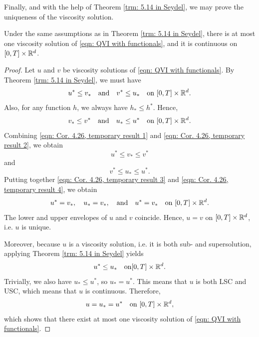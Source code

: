 Finally, and with the help of Theorem \ref{trm: 5.14 in Seydel}, we may prove the uniqueness of the viscosity solution.

\begin{corollary} 
\label{cor: Corollary 5.15 in Seydel}
    Under the same assumptions as in Theorem \ref{trm: 5.14 in Seydel}, there is at most one viscosity solution of \eqref{eqn: QVI with functionals}, and it is continuous on $[0,T] \times \mathbb{R}^d$. 
\end{corollary}
\begin{proof}
    Let $u$ and $v$ be viscosity solutions of \eqref{eqn: QVI with functionals}. By Theorem \ref{trm: 5.14 in Seydel}, we must have
    \begin{equation}
        u^* \leq v_* \quad \text{and} \quad v^* \leq u_* \quad \text{on } [0,T] \times \mathbb{R}^d. 
        \label{eqn: Cor. 4.26, temporary result 1}
    \end{equation}
    Also, for any function $h$, we always have $h_* \leq h^*$. Hence,
    \begin{equation}
        v_* \leq v^* \quad \text{and} \quad u_* \leq u^* \quad \text{on } [0,T] \times \mathbb{R}^d.
        \label{eqn: Cor. 4.26, temporary result 2}
    \end{equation}
    Combining \eqref{eqn: Cor. 4.26, temporary result 1} and \eqref{eqn: Cor. 4.26, temporary result 2}, we obtain
    \begin{equation}
        u^* \leq v_* \leq v^*
        \label{eqn: Cor. 4.26, temporary result 3}
    \end{equation}
    and 
    \begin{equation}
        v^* \leq u_* \leq u^*.
        \label{eqn: Cor. 4.26, temporary result 4}
    \end{equation}
    Putting together \eqref{eqn: Cor. 4.26, temporary result 3} and \eqref{eqn: Cor. 4.26, temporary result 4}, we obtain 
    \begin{equation*}
        u^* = v_*, \quad u_* = v_*, \quad \text{and} \quad u^* = v_* \quad \text{on } [0,T] \times \mathbb{R}^d. 
    \end{equation*}
    The lower and upper envelopes of $u$ and $v$ coincide. Hence, $u=v$ on $[0,T] \times \mathbb{R}^d$, i.e. $u$ is unique. 

    Moreover, because $u$ is a viscosity solution, i.e. it is both sub- and supersolution, applying Theorem \ref{trm: 5.14 in Seydel} yields
    \begin{equation*}
        u^* \leq u_* \quad \text{on} [0,T] \times \mathbb{R}^d.
    \end{equation*}
    Trivially, we also have $u_* \leq u^*$, so $u_* = u^*$. This means that $u$ is both LSC and USC, which means that $u$ is continuous. Therefore,
    \begin{equation*}
        u=u_*=u^* \quad \text{on } [0,T] \times \mathbb{R}^d,
    \end{equation*}
    which shows that there exist at most one viscosity solution of \eqref{eqn: QVI with functionals}.
\end{proof}

